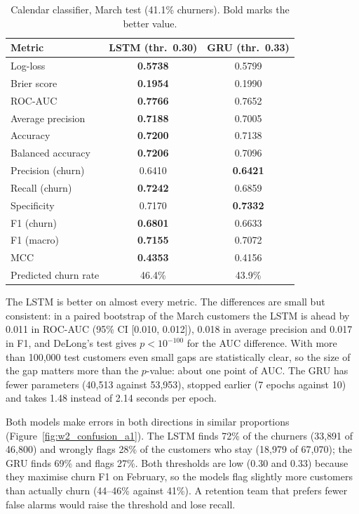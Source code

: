 \documentclass{article}
\begin{document}
\begin{table}[H]
\centering
\renewcommand{\arraystretch}{1.25}
\begin{tabular}{|l|c|c|}
\hline
\textbf{Metric} & \textbf{LSTM (thr.\ 0.30)} & \textbf{GRU (thr.\ 0.33)} \\ \hline
Log-loss            & \textbf{0.5738} & 0.5799 \\ \hline
Brier score         & \textbf{0.1954} & 0.1990 \\ \hline
ROC-AUC             & \textbf{0.7766} & 0.7652 \\ \hline
Average precision   & \textbf{0.7188} & 0.7005 \\ \hline
Accuracy            & \textbf{0.7200} & 0.7138 \\ \hline
Balanced accuracy   & \textbf{0.7206} & 0.7096 \\ \hline
Precision (churn)   & 0.6410 & \textbf{0.6421} \\ \hline
Recall (churn)      & \textbf{0.7242} & 0.6859 \\ \hline
Specificity         & 0.7170 & \textbf{0.7332} \\ \hline
F1 (churn)          & \textbf{0.6801} & 0.6633 \\ \hline
F1 (macro)          & \textbf{0.7155} & 0.7072 \\ \hline
MCC                 & \textbf{0.4353} & 0.4156 \\ \hline
Predicted churn rate & 46.4\% & 43.9\% \\ \hline
\end{tabular}
\caption{Calendar classifier, March test (41.1\% churners). Bold marks the better value.}
\label{tab:w2_test_a1}
\end{table}

The LSTM is better on almost every metric. The differences are small but consistent: in a paired bootstrap of the March customers the LSTM is ahead by 0.011 in ROC-AUC (95\% CI [0.010, 0.012]), 0.018 in average precision and 0.017 in F1, and DeLong's test gives $p < 10^{-100}$ for the AUC difference. With more than 100{,}000 test customers even small gaps are statistically clear, so the size of the gap matters more than the $p$-value: about one point of AUC. The GRU has fewer parameters (40{,}513 against 53{,}953), stopped earlier (7 epochs against 10) and takes 1.48 instead of 2.14 seconds per epoch.

Both models make errors in both directions in similar proportions (Figure~\ref{fig:w2_confusion_a1}). The LSTM finds 72\% of the churners (33{,}891 of 46{,}800) and wrongly flags 28\% of the customers who stay (18{,}979 of 67{,}070); the GRU finds 69\% and flags 27\%. Both thresholds are low (0.30 and 0.33) because they maximise churn F1 on February, so the models flag slightly more customers than actually churn (44--46\% against 41\%). A retention team that prefers fewer false alarms would raise the threshold and lose recall.
\end{document}
